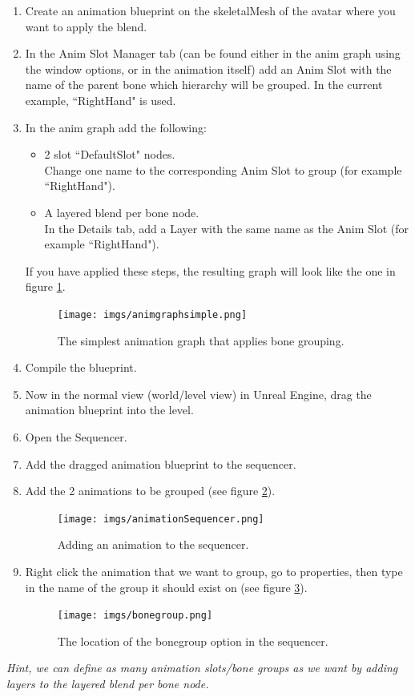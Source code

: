 \documentclass{uva-inf-article}
\begin{document}
\begin{enumerate}
    \item Create an animation blueprint on the skeletalMesh of the avatar where you want to apply the blend.
    \item In the Anim Slot Manager tab (can be found either in the anim graph using the window options, or in the animation itself) add an Anim Slot with the name of the parent bone which hierarchy will be grouped. In the current example, ``RightHand" is used.
    \item In the anim graph add the following:
    \begin{itemize}
        \item 2 slot ``DefaultSlot" nodes.\\Change one name to the corresponding Anim Slot to group (for example ``RightHand").
        \item A layered blend per bone node.\\In the Details tab, add a Layer with the same name as the Anim Slot (for example ``RightHand").
    \end{itemize}
    If you have applied these steps, the resulting graph will look like the one in figure \ref{fig:boneGrouping}.
    \begin{figure}[hbt!]
        \centering
        \texttt{[image: imgs/animgraphsimple.png]}
        \caption{The simplest animation graph that applies bone grouping.}
        \label{fig:boneGrouping}
    \end{figure}
    \item Compile the blueprint.
    \item Now in the normal view (world/level view) in Unreal Engine, drag the animation blueprint into the level.
    \item Open the Sequencer.
    \item Add the dragged animation blueprint to the sequencer.
    \item Add the 2 animations to be grouped (see figure \ref{fig:animSeq}).
    \begin{figure}[hbt!]
        \centering
        \texttt{[image: imgs/animationSequencer.png]}
        \caption{Adding an animation to the sequencer.}
        \label{fig:animSeq}
    \end{figure}
    \item Right click the animation that we want to group, go to properties, then type in the name of the group it should exist on (see figure \ref{fig:boneGroupPreference}).
    \begin{figure}[hbt!]
        \centering
        \texttt{[image: imgs/bonegroup.png]}
        \caption{The location of the bonegroup option in the sequencer.}
        \label{fig:boneGroupPreference}
    \end{figure}
\end{enumerate}
\textit{Hint, we can define as many animation slots/bone groups as we want by adding layers to the layered blend per bone node.}
\end{document}
